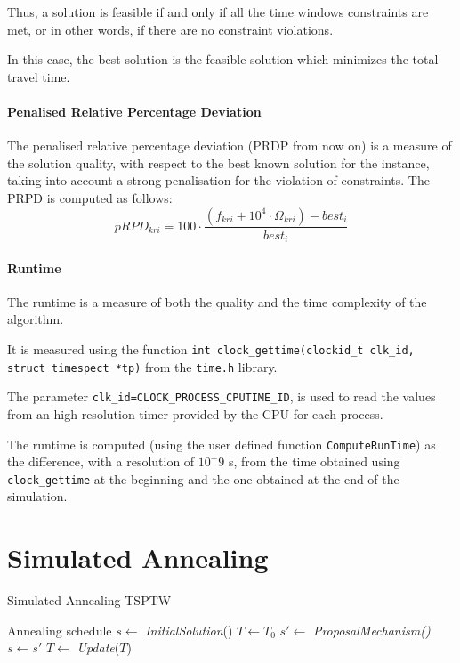 \begin{homeworkProblem}
Thus, a solution is feasible if and only if all the time windows constraints are met, or in other words, if there are no constraint violations.

In this case, the best solution is the feasible solution which minimizes the total travel time.

\paragraph{Penalised Relative Percentage Deviation}
The penalised relative percentage deviation (PRDP from now on) is a measure of the solution quality, with respect to the best known
solution for the instance, taking into account a strong penalisation for the violation of constraints.
The PRPD is computed as follows:
\begin{equation}
pRPD_{kri} = 100 \cdot \frac{(f_{kri} + 10^4\cdot\Omega_{kri})-best_i}{best_i}
\end{equation}

\paragraph{Runtime}
The runtime is a measure of both the quality and the time complexity of the algorithm.

It is measured using the function \verb|int clock_gettime(clockid_t clk_id, struct timespect *tp)| from the \verb|time.h| library.

The parameter \verb|clk_id=CLOCK_PROCESS_CPUTIME_ID|, is used to read the values from an high-resolution timer provided by the CPU for each process.

The runtime is computed (using the user defined function \verb|ComputeRunTime|) as the difference, with a resolution of $10^-9$ s, from the time obtained using \verb|clock_gettime| at the beginning and the one obtained at the end of the simulation.

\section{Simulated Annealing}

\begin{algorithm}
\caption{Simulated Annealing TSPTW}
\label{SA:TSPTW}
\begin{algorithmic}
  \Require Annealing schedule
  \State $s \gets$ \emph{InitialSolution}() 
  \State $T \gets T_0$ 
    \State $s' \gets$ \emph{ProposalMechanism()} 
     
      \State $s \gets s'$
    \EndIf
  \State $T \gets$ \emph{Update}($T$) 
\EndWhile


\end{algorithmic}
\end{algorithm}
\end{homeworkProblem}
